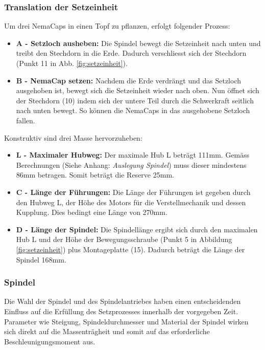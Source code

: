  
\subsubsection{Translation der Setzeinheit}
Um drei NemaCaps in einen Topf zu pflanzen, erfolgt folgender Prozess:
\begin{itemize}
	\item \textbf{A - Setzloch ausheben:} Die Spindel bewegt die Setzeinheit nach unten und treibt den Stechdorn in die Erde. Dadurch verschliesst sich der Stechdorn (Punkt 11 in Abb. \ref{fig:setzeinheit}). 

	\item \textbf{B - NemaCap setzen:} Nachdem die Erde verdrängt und das Setzloch ausgehoben ist, bewegt sich die Setzeinheit wieder nach oben. Nun öffnet sich der Stechdorn (10) indem sich der untere Teil durch die Schwerkraft seitlich nach unten bewegt. So können die NemaCaps in das ausgehobene Setzloch fallen.
\end{itemize}

Konstruktiv sind drei Masse hervorzuheben:
\begin{itemize}
	\item \textbf{L - Maximaler Hubweg:} Der maximale Hub L beträgt 111mm. Gemäss Berechnungen (Siehe Anhang: \textit{Auslegung Spindel}) muss dieser mindestens 86mm betragen. Somit beträgt die Reserve 25mm. 
	
	\item \textbf{C - Länge der Führungen:} Die Länge der Führungen ist gegeben durch den Hubweg L, der Höhe des Motors für die Verstellmechanik  und dessen Kupplung. Dies bedingt eine Länge von 270mm.
	
	\item \textbf{D - Länge der Spindel:} Die Spindellänge ergibt sich durch den maximalen Hub L und der Höhe der Bewegungsschraube (Punkt 5 in Abbildung \ref{fig:setzeinheit}) plus Montageplatte (15). Dadurch beträgt die Länge der Spindel 168mm.
\end{itemize}

\subsubsection{Spindel} \label{sec:Umsetzung_Spindel}
Die Wahl der Spindel und des Spindelantriebes haben einen entscheidenden Einfluss auf die Erfüllung des Setzprozesses innerhalb der vorgegeben Zeit. Parameter wie Steigung, Spindeldurchmesser und Material der Spindel wirken sich direkt auf die Massenträgheit und somit auf das erforderliche Beschleunigungsmoment aus.
\newline

